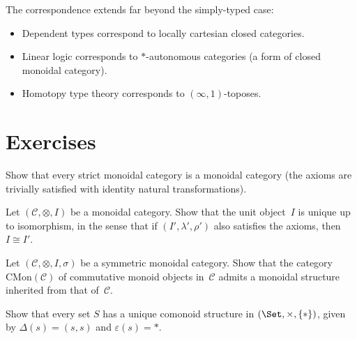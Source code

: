 \begin{remark}\label{rem:curry-howard-extensions}
The correspondence extends far beyond the simply-typed case:
\begin{itemize}
\item Dependent types correspond to locally cartesian closed categories.
\item Linear logic corresponds to $*$-autonomous categories (a form of
      closed monoidal category).
\item Homotopy type theory corresponds to $(\infty,1)$-toposes.
\end{itemize}
\end{remark}



\section{Exercises}\label{sec:monoidal-exercises}

\begin{exercise}\label{ex:strict-is-monoidal}
Show that every strict monoidal category is a monoidal category
(the axioms are trivially satisfied with identity natural transformations).
\end{exercise}

\begin{exercise}\label{ex:monoidal-unique-unit}
Let $(\mathcal{C}, \otimes, I)$ be a monoidal category.  Show that the
unit object~$I$ is unique up to isomorphism, in the sense that if
$(I', \lambda', \rho')$ also satisfies the axioms, then $I\cong I'$.
\end{exercise}

\begin{exercise}\label{ex:commutative-monoid-object}
Let $(\mathcal{C}, \otimes, I, \sigma)$ be a symmetric monoidal category.
Show that the category $\mathrm{CMon}(\mathcal{C})$ of commutative monoid
objects in~$\mathcal{C}$ admits a monoidal structure inherited from that
of~$\mathcal{C}$.
\end{exercise}

\begin{exercise}\label{ex:comonoid-in-set}
Show that every set $S$ has a unique comonoid structure in
$(\Set, \times, \{*\})$, given by $\Delta(s) = (s,s)$ and
$\varepsilon(s) = *$.
\end{exercise}

